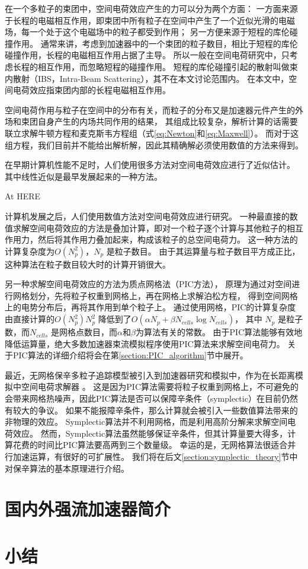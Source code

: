 在一个多粒子的束团中，空间电荷效应产生的力可以分为两个方面：
一方面来源于长程的电磁相互作用，即束团中所有粒子在空间中产生了一个近似光滑的电磁场，每一个处于这个电磁场中的粒子都受到作用；
另一方便来源于短程的库伦碰撞作用。
通常来讲，考虑到加速器中的一个束团的粒子数目，相比于短程的库伦碰撞作用，长程的电磁相互作用占据了主导。
所以一般在空间电荷研究中，只考虑长程的相互作用，而忽略短程的碰撞作用。
短程的库伦碰撞引起的散射叫做束内散射（IBS，Intra-Beam Scattering），其不在本文讨论范围内。
在本文中，空间电荷效应指束团内部的长程电磁相互作用。

空间电荷作用与粒子在空间中的分布有关，而粒子的分布又是加速器元件产生的外场和束团自身产生的内场共同作用的结果，
其组成比较复杂，解析计算的话需要联立求解牛顿方程和麦克斯韦方程组（式\ref{eq:Newton}和\ref{eq:Maxwell}）。
而对于这组方程，我们目前并不能给出解析解，因此其精确解必须使用数值的方法来得到。

在早期计算机性能不足时，人们使用很多方法对空间电荷效应进行了近似估计。
其中线性近似是最早发展起来的一种方法\cite{lv2004beamoptic}。

At HERE

计算机发展之后，人们使用数值方法对空间电荷效应进行研究。
一种最直接的数值求解空间电荷效应的方法是叠加计算，即对一个粒子逐个计算与其他粒子的相互作用力，然后将其作用力叠加起来，构成该粒子的总空间电荷力。
这一种方法的计算复杂度为$O(N_p^2)$，$N_p$ 是粒子数目。
由于其运算量与粒子数目平方成正比，这种算法在粒子数目较大时的计算开销很大。

另一种求解空间电荷效应的方法为质点网格法（PIC方法），
原理为通过对空间进行网格划分，先将粒子权重到网格上，再在网格上求解泊松方程，
得到空间网格上的电势分布后，再将其作用到单个粒子上。
通过使用网格，PIC的计算复杂度由直接计算的$O(N_p^2)$$N_p^2$ 降低到了$O(\alpha N_p + \beta N_{cells}\log{N_{cells}})$，
其中 $N_p$ 是粒子数，而$N_{cells}$ 是网格点数目，而$\alpha$和$\beta$为算法有关的常数。
由于PIC算法能够有效地降低运算量，绝大多数加速器束流模拟程序使用PIC算法来求解空间电荷力。
关于PIC算法的详细介绍将会在第\ref{section:PIC_algorithm}节中展开。

最近，无网格保辛多粒子追踪模型被引入到加速器研究和模拟中，作为在长距离模拟中空间电荷求解器 \cite{symplectic_ji2017}。
这是因为PIC算法需要将粒子权重到网格上，不可避免的会带来网格热噪声，因此PIC算法是否可以保障辛条件（symplectic）在目前仍然有较大的争议。
如果不能报障辛条件，那么计算就会被引入一些数值算法带来的非物理的效应。
Symplectic算法并不利用网格，而是利用高阶分解来求解空间电荷效应。
然而，Symplectic算法虽然能够保证辛条件，但其计算量要大得多，计算花费的时间比PIC算法要高两到三个数量级。
幸运的是，无网格算法很适合并行加速运算，有很好的可扩展性。
我们将在后文\ref{section:symplectic_theory}节中对保辛算法的基本原理进行介绍。


\section{国内外强流加速器简介}

\section{小结}